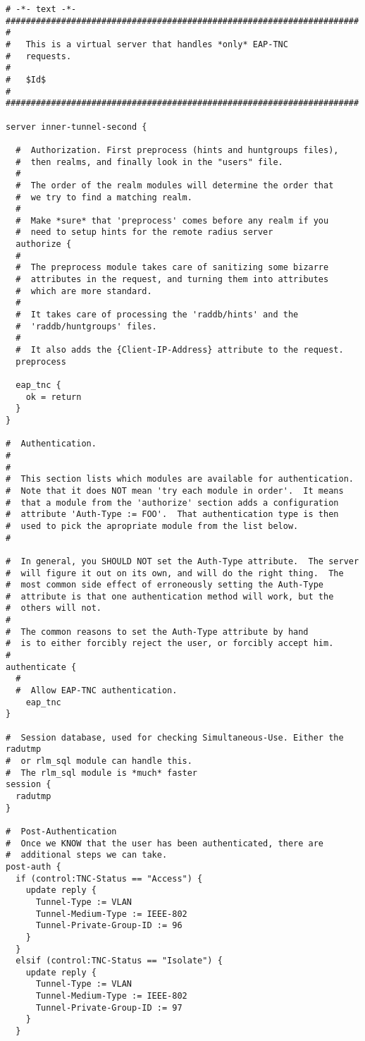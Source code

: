 \begin{lstlisting}[style=eapttls-config]
# -*- text -*-
######################################################################
#
#	This is a virtual server that handles *only* EAP-TNC
#	requests.
#
#	$Id$
#
######################################################################

server inner-tunnel-second {

  #  Authorization. First preprocess (hints and huntgroups files),
  #  then realms, and finally look in the "users" file.
  #
  #  The order of the realm modules will determine the order that
  #  we try to find a matching realm.
  #
  #  Make *sure* that 'preprocess' comes before any realm if you
  #  need to setup hints for the remote radius server
  authorize {
  #
  #  The preprocess module takes care of sanitizing some bizarre
  #  attributes in the request, and turning them into attributes
  #  which are more standard.
  #
  #  It takes care of processing the 'raddb/hints' and the
  #  'raddb/huntgroups' files.
  #
  #  It also adds the {Client-IP-Address} attribute to the request.
  preprocess

  eap_tnc {
    ok = return
  }
}

#  Authentication.
#
#
#  This section lists which modules are available for authentication.
#  Note that it does NOT mean 'try each module in order'.  It means
#  that a module from the 'authorize' section adds a configuration
#  attribute 'Auth-Type := FOO'.  That authentication type is then
#  used to pick the apropriate module from the list below.
# 

#  In general, you SHOULD NOT set the Auth-Type attribute.  The server
#  will figure it out on its own, and will do the right thing.  The
#  most common side effect of erroneously setting the Auth-Type
#  attribute is that one authentication method will work, but the
#  others will not.
#
#  The common reasons to set the Auth-Type attribute by hand
#  is to either forcibly reject the user, or forcibly accept him.
#
authenticate {
  #
  #  Allow EAP-TNC authentication.
    eap_tnc
}

#  Session database, used for checking Simultaneous-Use. Either the radutmp 
#  or rlm_sql module can handle this.
#  The rlm_sql module is *much* faster
session { 
  radutmp
}

#  Post-Authentication
#  Once we KNOW that the user has been authenticated, there are
#  additional steps we can take.
post-auth {
  if (control:TNC-Status == "Access") {
    update reply {
      Tunnel-Type := VLAN
      Tunnel-Medium-Type := IEEE-802
      Tunnel-Private-Group-ID := 96
    }
  }
  elsif (control:TNC-Status == "Isolate") {
    update reply {
      Tunnel-Type := VLAN
      Tunnel-Medium-Type := IEEE-802
      Tunnel-Private-Group-ID := 97
    }
  }


\end{lstlisting}
